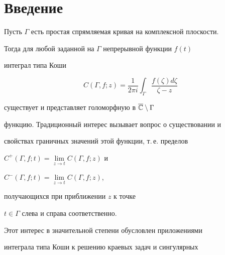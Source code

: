 \date{}




\pagestyle{plain} %







\maketitle


\label{begin}








\section{Введение}





Пусть $\Gamma$ есть простая спрямляемая кривая на комплексной плоскости.


Тогда для любой заданной на $\Gamma$ непрерывной функции $f(t)$


интеграл типа Коши


\begin{equation}


C(\Gamma,f;z) = \frac{1}{2\pi i}\int_{\Gamma}


{\frac{f(\zeta)d\zeta}{\zeta-z}}


\end{equation}


существует и представляет голоморфную в $\overline{\Bbb C}\setminus\Gamma$


функцию. Традиционный интерес вызывает вопрос о существовании и


свойствах граничных значений этой функции, т.\,е. пределов


$C^{+}(\Gamma, f;t) = \lim\limits_{z\to t}{C(\Gamma, f;z)}$ и


$C^{-}(\Gamma, f;t) = \lim\limits_{z\to t}{C(\Gamma, f;z)}$,


получающихся при приближении $z$ к точке


$t\in\Gamma$ слева и справа соответственно.


Этот интерес в значительной степени обусловлен приложениями


интеграла типа Коши к решению краевых задач и сингулярных


